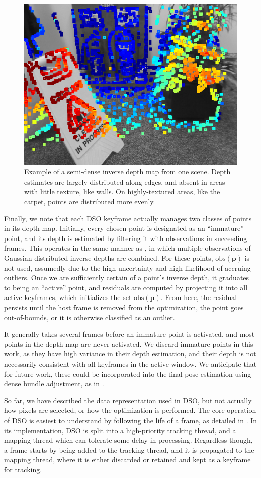 \begin{figure}[h]
	\centering
	\includegraphics[width=0.5\linewidth]{methodology/depth_map.png}
	\caption{Example of a semi-dense inverse depth map from one scene. Depth estimates are largely distributed along edges, and absent in areas with little texture, like walls. On highly-textured areas, like the carpet, points are distributed more evenly.}
	\label{fig:depth_map]}
\end{figure}

Finally, we note that each DSO keyframe actually manages two classes of points in its depth map. Initially, every chosen point is designated as an ``immature'' point, and its depth is estimated by filtering it with observations in succeeding frames. This operates in the same manner as \cite{engel2013semi}, in which multiple observations of Gaussian-distributed inverse depths are combined. For these points, $\text{obs}(\boldsymbol{p})$ is not used, assumedly due to the high uncertainty and high likelihood of accruing outliers. Once we are sufficiently certain of a point's inverse depth, it graduates to being an ``active'' point, and residuals are computed by projecting it into all active keyframes, which initializes the set $\text{obs}(\boldsymbol{p})$. From here, the residual persists until the host frame is removed from the optimization, the point goes out-of-bounds, or it is otherwise classified as an outlier.

It generally takes several frames before an immature point is activated, and most points in the depth map are never activated. We discard immature points in this work, as they have high variance in their depth estimation, and their depth is not necessarily consistent with all keyframes in the active window. We anticipate that for future work, these could be incorporated into the final pose estimation using dense bundle adjustment, as in \cite{engel2014lsd}.

So far, we have described the data representation used in DSO, but not actually how pixels are selected, or how the optimization is performed. The core operation of DSO is easiest to understand by following the life of a frame, as detailed in . In its implementation, DSO is split into a high-priority tracking thread, and a mapping thread which can tolerate some delay in processing. Regardless though, a frame starts by being added to the tracking thread, and it is propagated to the mapping thread, where it is either discarded or retained and kept as a keyframe for tracking.

